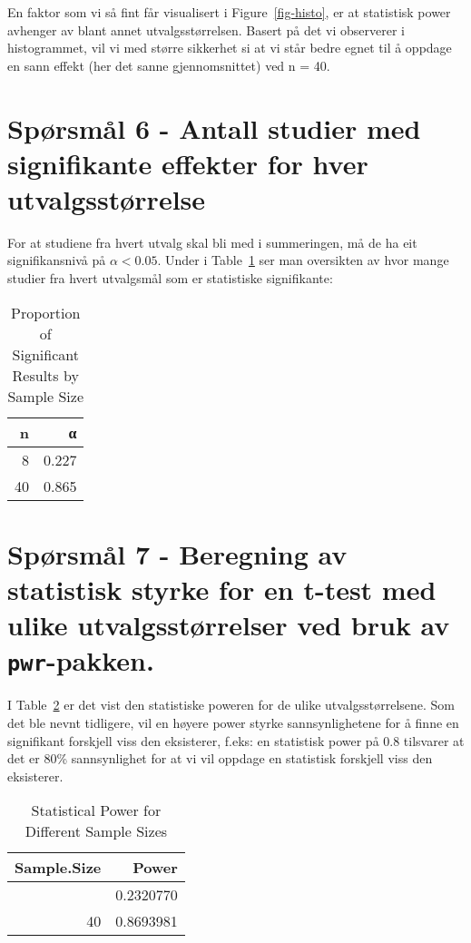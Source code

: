 \documentclass[
  letterpaper,
  DIV=11,
  numbers=noendperiod]{scrreprt}
\begin{document}
En faktor som vi så fint får visualisert i Figure~\ref{fig-histo}, er at
statistisk power avhenger av blant annet utvalgsstørrelsen. Basert på
det vi observerer i histogrammet, vil vi med større sikkerhet si at vi
står bedre egnet til å oppdage en sann effekt (her det sanne
gjennomsnittet) ved n = 40.

\section{Spørsmål 6 - Antall studier med signifikante effekter for hver
utvalgsstørrelse}\label{spuxf8rsmuxe5l-6---antall-studier-med-signifikante-effekter-for-hver-utvalgsstuxf8rrelse}

For at studiene fra hvert utvalg skal bli med i summeringen, må de ha
eit signifikansnivå på \(\alpha < 0.05\). Under i Table~\ref{tbl-sig}
ser man oversikten av hvor mange studier fra hvert utvalgsmål som er
statistiske signifikante:

\begin{longtable}[t]{rr}

\caption{\label{tbl-sig}Proportion of Significant Results by Sample
Size}

\tabularnewline

\toprule
n & α\\
\midrule
8 & 0.227\\
40 & 0.865\\
\bottomrule

\end{longtable}

\section{\texorpdfstring{Spørsmål 7 - Beregning av statistisk styrke for
en t-test med ulike utvalgsstørrelser ved bruk av
\texttt{pwr}-pakken.}{Spørsmål 7 - Beregning av statistisk styrke for en t-test med ulike utvalgsstørrelser ved bruk av pwr-pakken.}}\label{spuxf8rsmuxe5l-7---beregning-av-statistisk-styrke-for-en-t-test-med-ulike-utvalgsstuxf8rrelser-ved-bruk-av-pwr-pakken.}

I Table~\ref{tbl-pwr} er det vist den statistiske poweren for de ulike
utvalgsstørrelsene. Som det ble nevnt tidligere, vil en høyere power
styrke sannsynlighetene for å finne en signifikant forskjell viss den
eksisterer, f.eks: en statistisk power på 0.8 tilsvarer at det er 80\%
sannsynlighet for at vi vil oppdage en statistisk forskjell viss den
eksisterer.

\begin{longtable}[]{@{}rr@{}}

\caption{\label{tbl-pwr}Statistical Power for Different Sample Sizes}

\tabularnewline

\toprule\noalign{}
Sample.Size & Power \\
\midrule\noalign{}
\endhead
\bottomrule\noalign{}
\endlastfoot
8 & 0.2320770 \\
40 & 0.8693981 \\

\end{longtable}
\end{document}
